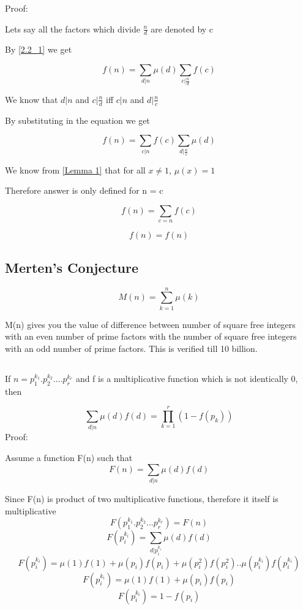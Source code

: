 \documentclass{article}
\begin{document}
Proof: 

Lets say all the factors which divide \(\frac{n}{d}\) are denoted by c

By \ref{2.2_1} we get

\[
    f(n) = \sum_{d\vert n} \mu(d) \sum_{c \vert \frac{n}{d}}f(c)
\]

We know that \( d\vert n\) and \( c\vert \frac{n}{d}\) iff \(c\vert n \) and \(d\vert \frac{n}{c}\)

By substituting in the equation we get

\[
    f(n) = \sum_{c\vert n} f(c) \sum_{d \vert \frac{n}{c}}\mu(d)
\]

We know from \ref{Lemma 1} that for all \(x \neq 1\),  \(\mu(x) = 1\)

Therefore answer is only defined for n = c

\[
    f(n) = \sum_{c = n}f(c)
\]

\[
    f(n) = f(n)
\]

\subsection{Merten's Conjecture}
\[
    M(n) = \sum_{k = 1}^{n} \mu(k)
\]


M(n) gives you the value of difference between number of square free integers \indent with an even number of prime factors with the number of square free integers \indent with an odd number of prime factors. This is verified till 10 billion.


\subsection{}


If \(n = p_1^{k_1} . p_2^{k_2} . . . . p_r^{k_r}\) and f is a multiplicative function which is not identically 0, then

\[
    \sum_{d\vert n}\mu(d)f(d) = \prod_{k=1}^{r}(1 - f(p_k))
\]
Proof:

Assume a function F(n) such that
\[ F(n) = \sum_{d\vert n} \mu(d)f(d) \]

Since F(n) is product of two multiplicative functions, therefore it itself is \indent multiplicative
\[ F(p_1^{k_1} . p_2^{k_2} . . . p_r^{k_r} ) = F(n)\]
\[
    F(p_i^{k_i}) = \sum_{d\vert p_i^{k_i}} \mu(d)f(d)
\]
\[
    F(p_i^{k_i}) = \mu(1)f(1) + \mu(p_i)f(p_i) + \mu(p_i^2)f(p_i^2) . . \mu(p_i^{k_i})f(p_i^{k_i})
\]
\[
    F(p_i^{k_i}) = \mu(1)f(1) + \mu(p_i)f(p_i)
\]
\begin{equation}\label{equation_1}
    F(p_i^{k_i}) = 1 - f(p_i)
\end{equation}
\end{document}
